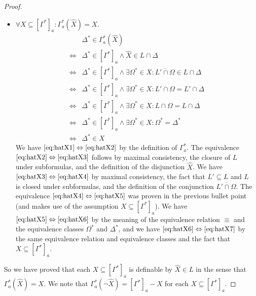 \documentclass[12pt]{article}
\theoremstyle{definition}
\begin{document}
\begin{proof}
\begin{itemize}
  \item $\forall X\subseteq[\Gamma^*]_a:\Gamma^*_a(\hat X)=X$.
    \begin{eqnarray}
      && \Delta^*\in\Gamma^*_a(\hat X)
      \label{eq:hatX1}
      \\
      &\Leftrightarrow &
      \Delta^*\in[\Gamma^*]_a \land
      \hat X\in L\cap\Delta
      \label{eq:hatX2}
      \\
      &\Leftrightarrow &
      \Delta^*\in[\Gamma^*]_a \land
      \exists\Omega^*\in X:
      \overline{L'\cap\Omega}\in L\cap\Delta
      \label{eq:hatX3}
      \\
      &\Leftrightarrow &
      \Delta^*\in[\Gamma^*]_a \land
      \exists\Omega^*\in X:
      L'\cap\Omega=L'\cap\Delta
      \label{eq:hatX4}
      \\
      &\Leftrightarrow &
      \Delta^*\in[\Gamma^*]_a \land
      \exists\Omega^*\in X:
      L\cap\Omega=L\cap\Delta
      \label{eq:hatX5}      
      \\
      &\Leftrightarrow &
      \Delta^*\in[\Gamma^*]_a \land
      \exists\Omega^*\in X:
      \Omega^*=\Delta^*
      \label{eq:hatX6}
      \\
      &\Leftrightarrow &
      \Delta^*\in X
      \label{eq:hatX7}
    \end{eqnarray}
    We have $\eqref{eq:hatX1}\Leftrightarrow\eqref{eq:hatX2}$ by the
    definition of $\Gamma^*_a$.  The equivalence
    $\eqref{eq:hatX2}\Leftrightarrow\eqref{eq:hatX3}$ follows by
    maximal consistency, the closure of $L$ under subformulas, and the
    definition of the disjunction $\hat X$.  We have
    $\eqref{eq:hatX3}\Leftrightarrow\eqref{eq:hatX4}$ by maximal
    consistency, the fact that $L'\subseteq L$ and $L$ is closed under
    subformulas, and the definition of the conjunction
    $\overline{L'\cap\Omega}$.  The equivalence
    $\eqref{eq:hatX4}\Leftrightarrow\eqref{eq:hatX5}$ was proven in
    the previous bullet point (and makes use of the assumption
    $X\subseteq[\Gamma^*]_a$).  We have
    $\eqref{eq:hatX5}\Leftrightarrow\eqref{eq:hatX6}$ by the meaning
    of the equivalence relation $\equiv$ and the equivalence classes
    $\Omega^*$ and $\Delta^*$, and we have
    $\eqref{eq:hatX6}\Leftrightarrow\eqref{eq:hatX7}$ by the same
    equivalence relation and equivalence classes and the fact that
    $X\subseteq[\Gamma^*]_a$.
  \end{itemize}
  So we have proved that each $X\subseteq[\Gamma^*]_a$ is definable by
  $\hat X\in L$ in the sense that $\Gamma^*_a(\hat X)=X$.  We note
  that $\Gamma^*_a(\lnot\hat X)=[\Gamma^*]_a-X$ for each
  $X\subseteq[\Gamma^*]_a$.


\end{proof}
\end{document}
